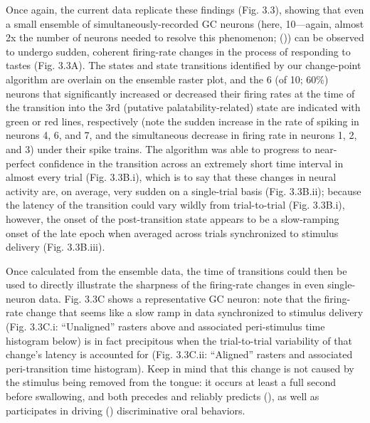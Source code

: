 \begin{refsection}
Once again, the current data replicate these findings (Fig. 3.3), showing that even a small ensemble of simultaneously-recorded GC neurons (here, 10—again, almost 2x the number of neurons needed to resolve this phenomenon; (\cite{jones2007a})) can be observed to undergo sudden, coherent firing-rate changes in the process of responding to tastes (Fig. 3.3A). The states and state transitions identified by our change-point algorithm are overlain on the ensemble raster plot, and the 6 (of 10; 60\%) neurons that significantly increased or decreased their firing rates at the time of the transition into the 3rd (putative palatability-related) state are indicated with green or red lines, respectively (note the sudden increase in the rate of spiking in neurons 4, 6, and 7, and the simultaneous decrease in firing rate in neurons 1, 2, and 3) under their spike trains. The algorithm was able to progress to near-perfect confidence in the transition across an extremely short time interval in almost every trial (Fig. 3.3B.i), which is to say that these changes in neural activity are, on average, very sudden on a single-trial basis (Fig. 3.3B.ii); because the latency of the transition could vary wildly from trial-to-trial (Fig. 3.3B.i), however, the onset of the post-transition state appears to be a slow-ramping onset of the late epoch when averaged across trials synchronized to stimulus delivery (Fig. 3.3B.iii). 

Once calculated from the ensemble data, the time of transitions could then be used to directly illustrate the sharpness of the firing-rate changes in even single-neuron data. Fig. 3.3C shows a representative GC neuron: note that the firing-rate change that seems like a slow ramp in data synchronized to stimulus delivery (Fig. 3.3C.i: “Unaligned” rasters above and associated peri-stimulus time histogram below) is in fact precipitous when the trial-to-trial variability of that change’s latency is accounted for (Fig. 3.3C.ii: “Aligned” rasters and associated peri-transition time histogram). Keep in mind that this change is not caused by the stimulus being removed from the tongue: it occurs at least a full second before swallowing, and both precedes and reliably predicts (\cite{sadacca2016a}), as well as participates in driving (\cite{mukherjee2019a}) discriminative oral behaviors.


\end{refsection}
